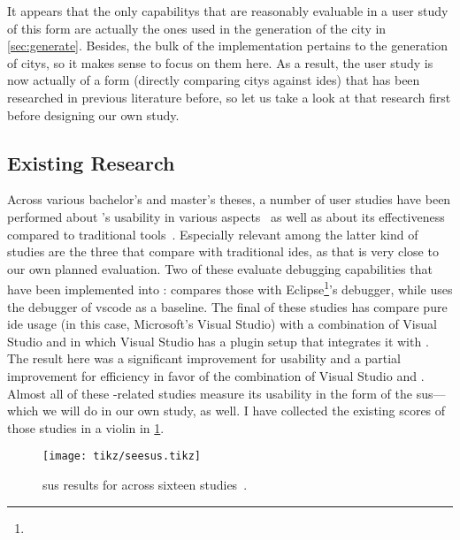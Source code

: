 \documentclass[../thesis]{subfiles}
\begin{document}
It appears that the only \glspl{capability} that are reasonably evaluable in a user study of this form are actually the ones used in the generation of the \gls{city} in \cref{sec:generate}.
Besides, the bulk of the implementation pertains to the generation of \glspl{city}, so it makes sense to focus on them here.
As a result, the user study is now actually of a form (directly comparing \glspl{city} against \glspl{ide}) that has been researched in previous literature before, so let us take a look at that research first before designing our own study.

\subsection{Existing Research}\label{subsec:research}
Across various bachelor's and master's theses, a number of user studies have been performed about \SEE{}'s usability in various aspects~\cite{davidwagner2020, felixgaebler2021, hannesmasuch2020, kevindoehl2020, maximilianwick2022, michelkrause2024, robertbohnsack2020, rubensmidt2021} as well as about its effectiveness compared to traditional tools~\cite{galperin2021, lennartkipka2020, moritz, nicoweiser2021, rohlfing2024, schramm2022, sulanabubakarov2021, yannisrohloff2021}.
Especially relevant among the latter kind of studies are the three that compare \SEE{} with traditional \glspl{ide}, as that is very close to our own planned evaluation.
Two of these evaluate debugging capabilities that have been implemented into \SEE{}:
\textcite{lennartkipka2020} compares those with Eclipse\footnote{
}'s debugger, while \textcite{rohlfing2024} uses the debugger of \gls{vscode} as a baseline.
The final of these studies has \textcite{schramm2022} compare pure \gls{ide} usage (in this case, Microsoft's Visual Studio) with a combination of Visual Studio and \SEE{} in which Visual Studio has a plugin setup that integrates it with \SEE{}.
The result here was a significant improvement for usability and a partial improvement for efficiency in favor of the combination of Visual Studio and \SEE{}.
Almost all of these \SEE{}-related studies measure its usability in the form of the \gls{sus}---which we will do in our own study, as well.
I have collected the existing scores of those studies in a \gls{violin} in \cref{fig:seesus}.


\begin{figure}
	\centering
	\texttt{[image: tikz/seesus.tikz]}
	\caption{\Gls{sus} results for \SEE{} across sixteen studies~\cite{davidwagner2020, felixgaebler2021, galperin2021, hannesmasuch2020, kevindoehl2020, lennartkipka2020, maximilianwick2022, michelkrause2024, moritz, nicoweiser2021, robertbohnsack2020, rohlfing2024, rubensmidt2021, schramm2022, sulanabubakarov2021, yannisrohloff2021}.}\label{fig:seesus}
\end{figure}
\end{document}
